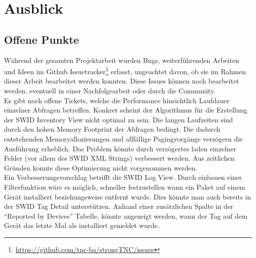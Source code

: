 \chapter{Ausblick}

\section{Offene Punkte} Während der gesamten Projektarbeit wurden Bugs,
weiterführenden Arbeiten und Ideen im Github
Issuetracker\footnote{\url{https://github.com/tnc-ba/strongTNC/issues}} erfasst,
ungeachtet davon, ob sie im Rahmen dieser Arbeit bearbeitet werden konnten.
Diese Issues können noch bearbeitet werden, eventuell in einer Nachfolgearbeit
oder durch die Community.\\
Es gibt noch offene Tickets, welche die Performance
hinsichtlich Laufdauer einzelner Abfragen betreffen. Konkret scheint der
Algorithmus für die Erstellung der SWID Inventory View nicht optimal zu sein.
Die langen Laufzeiten sind durch den hohen Memory Footprint der Abfragen
bedingt. Die dadurch entstehenden Memoryallozierungen und allfällige
Pagingvorgänge verzögern die Ausführung erheblich. Das Problem könnte durch
verzögertes laden einzelner Felder (vor allem des SWID XML Strings) verbessert
werden. Aus zeitlichen Gründen konnte diese Optimierung nicht vorgenommen
werden.\\
Ein Verbesserungsvorschlag betrifft die SWID Log View. Durch einbauen
einer Filterfunktion wäre es möglich, schneller festzustellen wann ein Paket auf
einem Gerät installiert beziehungsweise entfernt wurde. Dies könnte man auch bereits
in der SWID Tag Detail unterstützen. Anhand einer zusätzlichen Spalte in der
\enquote{Reported by Devices} Tabelle, könnte angezeigt werden, wann der Tag auf
dem Gerät das letzte Mal als installiert gemeldet wurde.

